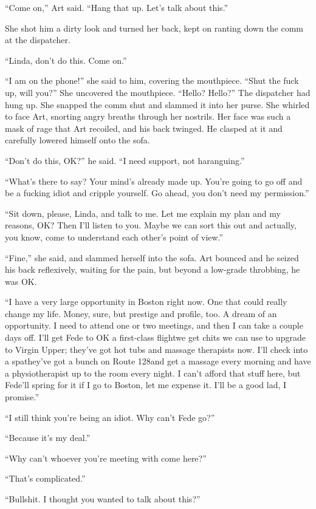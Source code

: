 “Come on,” Art said. “Hang that up. Let’s talk about this.”

She shot him a dirty look and turned her back, kept on ranting down
the comm at the dispatcher.

“Linda, don’t do this. Come on.”

“I am on the phone!” she said to him, covering the mouthpiece.
“Shut the fuck up, will you?” She uncovered the mouthpiece. “Hello?
Hello?” The dispatcher had hung up. She snapped the comm shut and
slammed it into her purse. She whirled to face Art, snorting angry
breaths through her nostrils. Her face was such a mask of rage that
Art recoiled, and his back twinged. He clasped at it and carefully
lowered himself onto the sofa.

“Don’t do this, OK?” he said. “I need support, not haranguing.”

“What’s there to say? Your mind’s already made up. You’re going to
go off and be a fucking idiot and cripple yourself. Go ahead, you
don’t need my permission.”

“Sit down, please, Linda, and talk to me. Let me explain my plan
and my reasons, OK? Then I’ll listen to you. Maybe we can sort this
out and actually, you know, come to understand each other’s point
of view.”

“Fine,” she said, and slammed herself into the sofa. Art bounced
and he seized his back reflexively, waiting for the pain, but
beyond a low-grade throbbing, he was OK.

“I have a very large opportunity in Boston right now. One that
could really change my life. Money, sure, but prestige and profile,
too. A dream of an opportunity. I need to attend one or two
meetings, and then I can take a couple days off. I’ll get Fede to
OK a first-class flight{\dash}we get chits we can use to upgrade to
Virgin Upper; they’ve got hot tubs and massage therapists now. I’ll
check into a spa{\dash}they’ve got a bunch on Route 128{\dash}and get a massage
every morning and have a physiotherapist up to the room every
night. I can’t afford that stuff here, but Fede’ll spring for it if
I go to Boston, let me expense it. I’ll be a good lad, I promise.”

“I still think you’re being an idiot. Why can’t Fede go?”

“Because it’s my deal.”

“Why can’t whoever you’re meeting with come here?”

“That’s complicated.”

“Bullshit. I thought you wanted to talk about this?”

